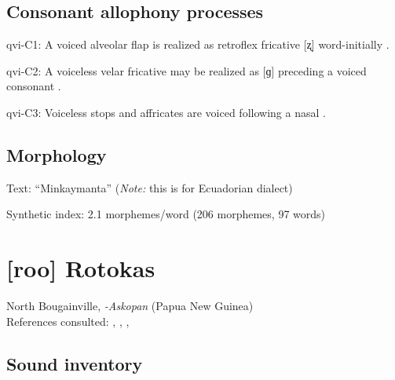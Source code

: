 {\subsection*{Consonant allophony processes}
\begin{appendixdesc}

\item[qvi-C1:] A voiced alveolar flap is realized as retroflex fricative [ʐ] word-initially \citep[202]{Cole1982}.

\item[qvi-C2:] A voiceless velar fricative may be realized as [ɡ] preceding a voiced consonant \citep[201]{Cole1982}.

\item[qvi-C3:] Voiceless stops and affricates are voiced following a nasal \citep[200]{Cole1982}.
\end{appendixdesc}
\subsection*{Morphology}

\begin{appendixdesc}

\item[Text:] “Minkaymanta” \citep[442--455]{Carpenter1982} (\textit{Note:} this is for Ecuadorian dialect)

\item[Synthetic index:] 2.1 morphemes/word (206 morphemes, 97 words)
\end{appendixdesc}
\section*{[roo] Rotokas}   %
North Bougainville, \textit{-Askopan} (Papua New Guinea)\medskip\\
References consulted: \citet{FirchowFirchow1969}, \citet{FirchowEtAl1973}, \citet{Robinson2006}, \citet{Robinson2011} 

\subsection*{Sound inventory}
\begin{appendixdesc}


\end{appendixdesc}}
